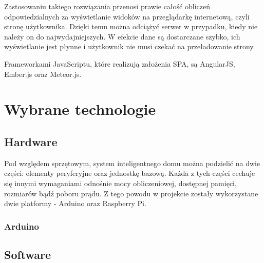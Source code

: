 \documentclass[eng,oneside]{mgr}
\begin{document}
Zastosowaniu takiego rozwiązania przenosi prawie całość obliczeń odpowiedzialnych za wyświetlanie widoków na przeglądarkę internetową, czyli stronę użytkownika. Dzięki temu można odciążyć serwer w przypadku, kiedy nie należy on do najwydajniejszych. W efekcie dane są dostarczane szybko, ich wyświetlanie jest płynne i użytkownik nie musi czekać na przeładowanie strony.

Frameworkami JavaScriptu, które realizują założenia SPA, są AngularJS, Ember.js oraz Meteor.js.

\chapter{Wybrane technologie}
\section{Hardware}
Pod względem sprzętowym, system inteligentnego domu można podzielić na dwie części: elementy peryferyjne oraz jednostkę bazową. Każda z tych części cechuje się innymi wymaganiami odnośnie mocy obliczeniowej, dostępnej pamięci, rozmiarów bądź poboru prądu. Z tego powodu w projekcie zostały wykorzystane dwie platformy - Arduino oraz Raspberry Pi.
\subsection{Arduino} %
\label{ssub:arduino}


\section{Software}
\end{document}

